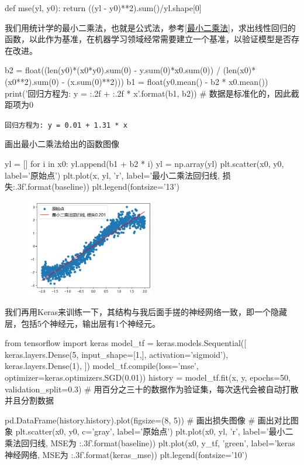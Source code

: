 \documentclass[a5paper, 11pt]{ctexbook}
\begin{document}
\begin{python}
    def mse(yl, y0):
    return ((yl - y0)**2).sum()/yl.shape[0]
\end{python}

我们用统计学的最小二乘法，也就是公式法，参考\ref{最小二乘法}，求出线性回归的函数，以此作为基准，在机器学习领域经常需要建立一个基准，以验证模型是否存在改进。

\begin{python}
    b2 = float((len(y0)*(x0*y0).sum(0) - y.sum(0)*x0.sum(0)) /
    (len(x0)*(x0**2).sum(0) - (x.sum(0)**2)))
    b1 = float(y0.mean() - b2 * x0.mean())
    print('回归方程为: y = {:.2f} + {:.2f} * x'.format(b1, b2))
    # 数据是标准化的，因此截距项为0
\end{python}
\verb|回归方程为: y = 0.01 + 1.31 * x|

画出最小二乘法给出的函数图像
\begin{python}
    yl = []
    for i in x0:
    yl.append(b1 + b2 * i)
    yl = np.array(yl)
    plt.scatter(x0, y0, label='原始点')
    plt.plot(x, yl, 'r', label='最小二乘法回归线, 损失{:.3f}'.format(baseline))
    plt.legend(fontsize='13')
\end{python}

\begin{figure}[h]
    \centering
    \includegraphics[width=0.5\textwidth]{figures/最小二乘法图像.png}
\end{figure}

我们再用Keras来训练一下，其结构与我后面手搓的神经网络一致，即一个隐藏层，包括5个神经元，输出层有1个神经元。

\begin{python}
    from tensorflow import keras
    model_tf = keras.models.Sequential([
            keras.layers.Dense(5, input_shape=[1,], activation='sigmoid'),
            keras.layers.Dense(1),
        ])
    model_tf.compile(loss='mse', optimizer=keras.optimizers.SGD(0.01))
    history = model_tf.fit(x, y, epochs=50, validation_split=0.3)
    # 用百分之三十的数据作为验证集，每次迭代会被自动打散并且分割数据

    pd.DataFrame(history.history).plot(figsize=(8, 5)) # 画出损失图像
    # 画出对比图象
    plt.scatter(x0, y0, c='gray', label='原始点')
    plt.plot(x0, yl, 'r', label='最小二乘法回归线, MSE为 {:.3f}'.format(baseline))
    plt.plot(x0, y_tf, 'green', label='keras神经网络, MSE为 {:.3f}'.format(keras_mse))
    plt.legend(fontsize='10')
\end{python}
\end{document}
